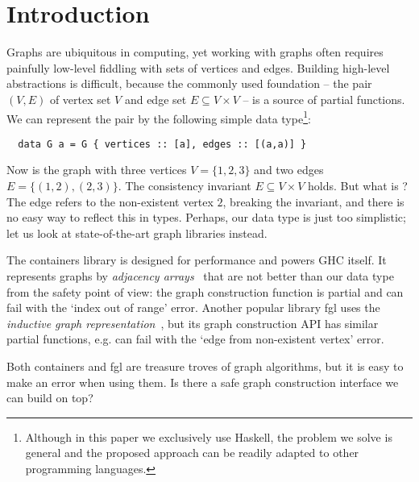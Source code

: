 \vspace{-2mm}
\section{Introduction}\label{sec-intro}

Graphs are ubiquitous in computing, yet working with graphs often requires
painfully low-level fiddling with sets of vertices and edges. Building high-level
abstractions is difficult, because the commonly used foundation -- the pair $(V, E)$
of vertex set $V$ and edge set $E \subseteq V \times V$ -- is a source of partial
functions. We can represent the pair by the following simple data type\footnote{Although
in this paper we exclusively use Haskell, the problem we solve is general and the
proposed approach can be readily adapted to other programming languages.}:

\vspace{0.5mm}
\begin{verbatim}
  data G a = G { vertices :: [a], edges :: [(a,a)] }
\end{verbatim}
\vspace{0.5mm}

\noindent
Now  is the graph with three vertices $V = \{1,2,3\}$ and
two edges $E = \{(1,2), (2,3)\}$. The consistency invariant $E \subseteq V \times V$ holds.
But what is ? The edge refers to the non-existent vertex $2$, breaking the
invariant, and there is no easy way to reflect this in types. Perhaps, our data type is just
too simplistic; let us look at state-of-the-art graph libraries instead.

The \textsf{containers} library is designed for performance and powers GHC itself. It
represents graphs by \emph{adjacency arrays}~\cite{1995_king_graphs} that are not
better than our data type from the safety point of view: the  graph construction
function is partial and can fail with the \textsf{`index out of range'} error.
Another popular library \textsf{fgl} uses the \emph{inductive graph
representation}~\cite{2001_erwig_inductive}, but its graph construction API has similar
partial functions, e.g.  can fail with the \textsf{`edge from non-existent
vertex'} error.

Both \textsf{containers} and \textsf{fgl} are treasure troves of graph algorithms,
but it is easy to make an error when using them. Is there a safe graph construction
interface we can build on top?

